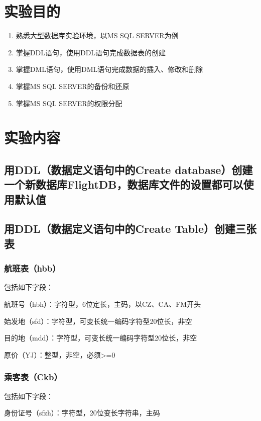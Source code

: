 \documentclass[UTF8,12pt]{article}
\begin{document}
\begin{center}
    \tableofcontents
\end{center}
\newpage

\section{实验目的}
\begin{enumerate}
    \item 熟悉大型数据库实验环境，以MS SQL SERVER为例
    \item 掌握DDL语句，使用DDL语句完成数据表的创建
    \item 掌握DML语句，使用DML语句完成数据的插入、修改和删除
    \item 掌握MS SQL SERVER的备份和还原
    \item 掌握MS SQL SERVER的权限分配
\end{enumerate}

\section{实验内容}
\subsection{用DDL（数据定义语句中的Create database）创建一个新数据库FlightDB，数据库文件的设置都可以使用默认值}

\subsection{用DDL（数据定义语句中的Create Table）创建三张表}
\subsubsection{航班表（hbb）}
包括如下字段：

航班号（hbh）：字符型，6位定长，主码，以CZ、CA、FM开头

始发地（sfd）：字符型，可变长统一编码字符型20位长，非空

目的地（mdd）：字符型，可变长统一编码字符型20位长，非空

原价（YJ）：整型，非空，必须>=0

\subsubsection{乘客表（Ckb）}
包括如下字段：

身份证号（sfzh）：字符型，20位变长字符串，主码
\end{document}
